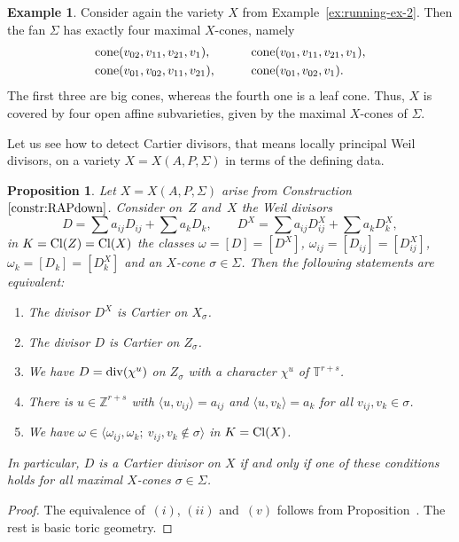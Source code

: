 \documentclass[pdftex]{sigma}%
\newtheorem{prop}[thm]{Proposition}
\theoremstyle{definition}
\newtheorem{exam}[thm]{Example}
\def\Cl{{\rm Cl}}
\def\TT{{\mathbb T}}
\def\ZZ{{\mathbb Z}}
\def\div{{\rm div}}
\def\bangle#1{{\langle #1 \rangle}}
\def\cone{{\rm cone}}
\numberwithin{equation}{section}
\begin{document}
\begin{exam}
\label{ex:running-ex-3}
Consider again the variety $X$
from Example~\ref{ex:running-ex-2}.
Then the fan $\Sigma$ has exactly four
maximal $X$-cones, namely
\begin{alignat*}{4}
&\cone(v_{02},v_{11},v_{21},v_1),
\qquad&&
\cone(v_{01},v_{11},v_{21},v_1),
\\
&\cone(v_{01},v_{02},v_{11},v_{21}),
\qquad&&
\cone(v_{01},v_{02},v_1).
\end{alignat*}
The first three are big cones, whereas the
fourth one is a leaf cone.
Thus, $X$ is covered by four open
affine subvarieties, given by the maximal
$X$-cones of $\Sigma$.
\end{exam}


Let us see how to detect Cartier divisors,
that means locally principal Weil divisors,
on a variety $X = X(A,P,\Sigma)$ in terms of
the defining data.


\begin{prop}
\label{prop:gorchar}
Let $X = X(A,P,\Sigma)$ arise from
Construction~$\ref{constr:RAPdown}$.
Consider on~$Z$ and~$X$ the Weil
divisors
\[
D =\sum a_{ij} D_{ij} + \sum a_k D_k,\qquad
D^X =\sum a_{ij} D^X_{ij} + \sum a_k D^X_k,
\]
in $K = \Cl(Z) = \Cl(X)$ the classes $\omega = [D] = [D^X]$,
$\omega_{ij} = [D_{ij}] = [D_{ij}^X]$,
$\omega_k = [D_k] = [D_k^X]$
and an $X$-cone $\sigma \in \Sigma$.
Then the following statements are equivalent:
\begin{enumerate}\itemsep=0pt
\item[$(i)$]
The divisor $D^X$ is Cartier on $X_\sigma$.
\item[$(ii)$]
The divisor $D$ is Cartier on $Z_\sigma$.
\item[$(iii)$]
We have $D = \div(\chi^u)$ on $Z_\sigma$ with
a character $\chi^u$ of $\TT^{r+s}$.
\item[$(iv)$]
There is $u \in \ZZ^{r+s}$ with
$\bangle{u,v_{ij}} = a_{ij}$ and
$\bangle{u,v_k} = a_k$ for all
$v_{ij}, v_k \in \sigma$.
\item[$(v)$]
We have
$\omega \in \bangle{\omega_{ij}, \omega_k; \ v_{ij}, v_k \not\in \sigma}$
in $K = \Cl(X)$.
\end{enumerate}
In particular, $D$ is a Cartier divisor on $X$
if and only if one of these conditions holds
for all maximal $X$-cones $\sigma \in \Sigma$.
\end{prop}

\begin{proof}
The equivalence of~$(i)$, $(ii)$ and~$(v)$ follows from
Proposition~\cite[Proposition~3.3.1.5]{ArDeHaLa}.
The rest is basic toric geometry.
\end{proof}
\end{document}
